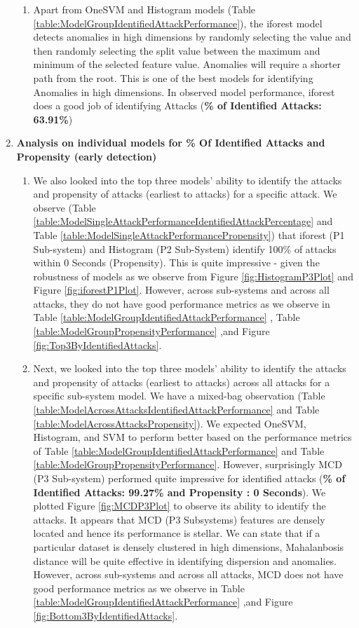 \documentclass{article}
\begin{document}
\begin{enumerate}
\begin{enumerate}
            \item Apart from OneSVM and Histogram models (Table \ref{table:ModelGroupIdentifiedAttackPerformance}), the iforest  model detects anomalies in high dimensions by randomly selecting the value and then randomly selecting the split value between the maximum and minimum of the selected feature value. Anomalies will require a shorter path from the root. This is one of the best models for identifying Anomalies in high dimensions. In observed model performance, iforest does a good job of identifying Attacks (\textbf{\% of Identified Attacks: 63.91\%})
     
        \end{enumerate}

        \item \textbf{Analysis on individual models for \% Of Identified Attacks and Propensity (early detection)}
        \begin{enumerate}
            \item We also looked into the top three models' ability to identify the attacks and propensity of attacks (earliest to attacks) for a specific attack. We observe (Table \ref{table:ModelSingleAttackPerformanceIdentifiedAttackPercentage} and Table \ref{table:ModelSingleAttackPerformancePropensity}) that iforest (P1 Sub-system) and Histogram (P2 Sub-System)  identify 100\% of attacks within 0 Seconds (Propensity). This is quite impressive - given the robustness of models as we observe from Figure \ref{fig:HistogramP3Plot} and Figure \ref{fig:iforestP1Plot}. However,  across sub-systems and across all attacks, they do not have good performance metrics as we observe in Table \ref{table:ModelGroupIdentifiedAttackPerformance} , Table \ref{table:ModelGroupPropensityPerformance} ,and Figure \ref{fig:Top3ByIdentifiedAttacks}.

            \item Next, we looked into  the top three models' ability to identify the attacks and propensity of attacks (earliest to attacks) across all attacks for a specific sub-system model. We have a mixed-bag observation (Table \ref{table:ModelAcrossAttacksIdentifiedAttackPerformance} and Table \ref{table:ModelAcrossAttacksPropensity}). We expected OneSVM, Histogram, and SVM to perform better based on the performance metrics of Table \ref{table:ModelGroupIdentifiedAttackPerformance} and Table \ref{table:ModelGroupPropensityPerformance}. However, surprisingly MCD (P3 Sub-system) performed quite impressive for identified attacks (\textbf{\% of Identified Attacks: 99.27\% and Propensity : 0 Seconds}). We plotted Figure \ref{fig:MCDP3Plot} to observe its ability to identify the attacks. It appears that MCD (P3 Subsystems) features are densely located and hence its performance is stellar. We can state that if a particular dataset is densely clustered in high dimensions, Mahalanbosis distance will be quite effective in identifying dispersion and anomalies.  However,  across sub-systems and across all attacks, MCD does not have good performance metrics as we observe in Table \ref{table:ModelGroupIdentifiedAttackPerformance} ,and Figure \ref{fig:Bottom3ByIdentifiedAttacks}.
    

\end{enumerate}
\end{enumerate}
\end{document}
